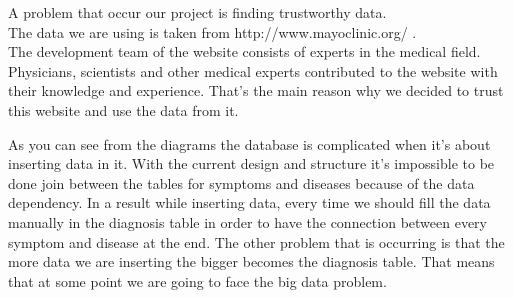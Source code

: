 A problem that occur our project is finding trustworthy data.\\
The data we are using is taken from http://www.mayoclinic.org/ .\\ 
The development team of the website consists of experts in the medical field. 
Physicians, scientists and other medical experts contributed to the website with their knowledge and experience. That’s the main reason why we decided to trust this website and use the data from it.   

As you can see from the diagrams the database is complicated when it’s about inserting data in it.
With the current design and structure it’s impossible to be done join between the tables for symptoms and diseases because of the data dependency. In a result while inserting data, every time we should fill the data manually in the diagnosis table in order to have the connection between every symptom and disease at the end. 
The other problem that is occurring is that the more data we are inserting the bigger becomes the diagnosis table. That means that at some point we are going to face the big data problem.

